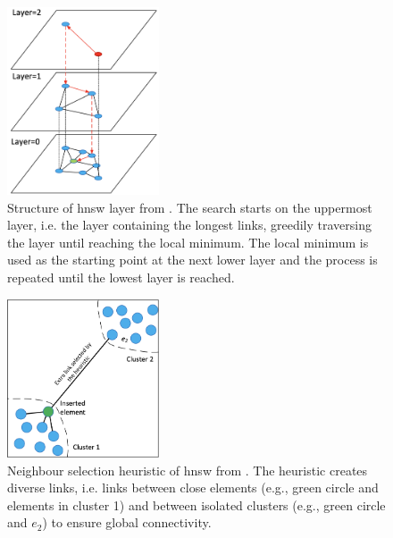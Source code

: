 \begin{figure}[htp] %
    \centering
    \includegraphics[width=0.4\textwidth]{images/HNSW-layer.png}
    \caption{Structure of \ac{hnsw} layer from \cite{Elasticsearch-kNN-HNSW}.
    The search starts on the uppermost layer, i.e. the layer containing the longest links, greedily traversing the layer until reaching the local minimum.
    The local minimum is used as the starting point at the next lower layer and the process is repeated until the lowest layer is reached.
    }
    \label{fig:hnsw-layer}
\end{figure}

\begin{figure}[htp] %
    \centering
    \includegraphics[width=0.4\textwidth]{images/HNSW-neighbour-selection-heuristic.png}
    \caption{Neighbour selection heuristic of \ac{hnsw} from \cite{Elasticsearch-kNN-HNSW}.
    The heuristic creates diverse links, i.e. links between close elements (e.g., green circle and elements in cluster 1) 
    and between isolated clusters (e.g., green circle and $e_2$) to ensure global connectivity.
    }
    \label{fig:hnsw-heuristic}
\end{figure}

